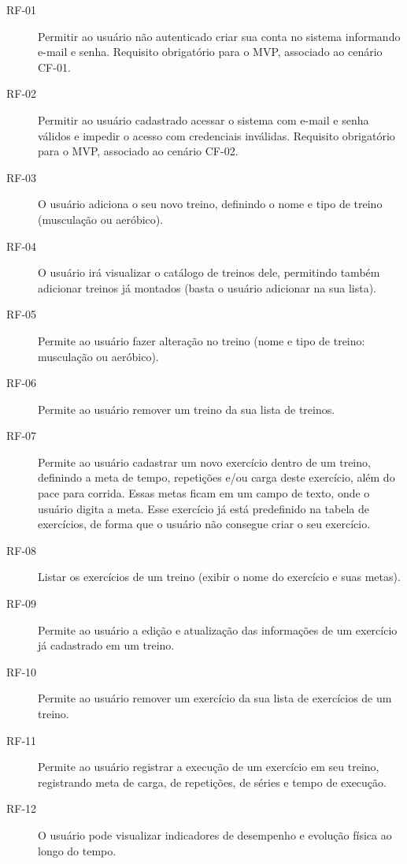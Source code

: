 \begin{description}
\item[RF-01] Permitir ao usuário não autenticado criar sua conta no sistema informando e-mail e senha. Requisito obrigatório para o MVP, associado ao cenário CF-01.

\item[RF-02] Permitir ao usuário cadastrado acessar o sistema com e-mail e senha válidos e impedir o acesso com credenciais inválidas. Requisito obrigatório para o MVP, associado ao cenário CF-02.

\item[RF-03] O usuário adiciona o seu novo treino, definindo o nome e tipo de treino (musculação ou aeróbico).

\item[RF-04] O usuário irá visualizar o catálogo de treinos dele, permitindo também adicionar treinos já montados (basta o usuário adicionar na sua lista).

\item[RF-05] Permite ao usuário fazer alteração no treino (nome e tipo de treino: musculação ou aeróbico).

\item[RF-06] Permite ao usuário remover um treino da sua lista de treinos.

\item[RF-07] Permite ao usuário cadastrar um novo exercício dentro de um treino, definindo a meta de tempo, repetições e/ou carga deste exercício, além do pace para corrida. Essas metas ficam em um campo de texto, onde o usuário digita a meta. Esse exercício já está predefinido na tabela de exercícios, de forma que o usuário não consegue criar o seu exercício.

\item[RF-08] Listar os exercícios de um treino (exibir o nome do exercício e suas metas).

\item[RF-09] Permite ao usuário a edição e atualização das informações de um exercício já cadastrado em um treino.

\item[RF-10] Permite ao usuário remover um exercício da sua lista de exercícios de um treino.

\item[RF-11] Permite ao usuário registrar a execução de um exercício em seu treino, registrando meta de carga, de repetições, de séries e tempo de execução.

\item[RF-12] O usuário pode visualizar indicadores de desempenho e evolução física ao longo do tempo.


\end{description}
